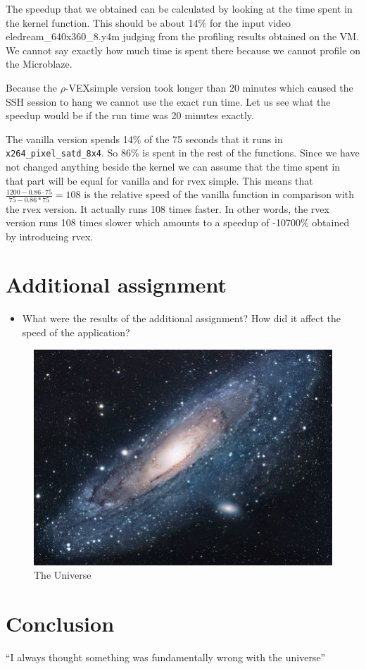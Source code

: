\documentclass{article}
\newcommand{\rvex}{\ensuremath{\rho}-VEX}
\newcommand{\satd}{\texttt{x264\_pixel\_satd\_8x4}}
\begin{document}
The speedup that we obtained can be calculated by looking at the time spent in
the kernel function. This should be about 14\% for the input video
eledream\_640x360\_8.y4m judging from the profiling results obtained on the
VM\@. We cannot say exactly how much time is spent there because we cannot
profile on the Microblaze.

Because the \rvex simple version took longer than 20 minutes which caused the
SSH session to hang we cannot use the exact run time. Let us see what the
speedup would be if the run time was 20 minutes exactly.

The vanilla version spends 14\% of the 75 seconds that it runs in \satd{}. So
86\% is spent in the rest of the functions. Since we have not changed anything
beside the kernel we can assume that the time spent in that part will be equal
for vanilla and for rvex simple. This means that $\frac{1200 - 0.86\cdot75}{75 -
0.86*75} = 108$ is the relative speed of the vanilla function in comparison
with the rvex version.  It actually runs 108 times faster.  In other words, the
rvex version runs 108 times slower which amounts to a speedup of -10700\%
obtained by introducing rvex.

\section{Additional assignment}

\begin{itemize}
  \item What were the results of the additional assignment? How did it affect
        the speed of the application?
\end{itemize}

\begin{figure}[h!]
  \centering
  \includegraphics[scale=1.7]{universe.jpg}
  \caption{The Universe}
  \label{threadsVsSync}
\end{figure}

\section{Conclusion}

``I always thought something was fundamentally wrong with the universe'' \citep{adams1995hitchhiker}



\end{document}
